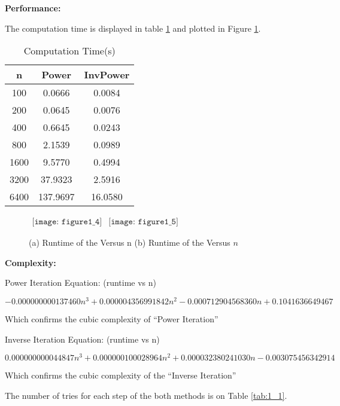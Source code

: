 {{{\LARGE \textbf{Performance:}}

The computation time is displayed in table \ref{tab:1_2} and plotted in Figure \ref{fig:fig1_4}.

\begin{table}[H]
    \centering
    \caption{Computation Time(s)}
    \begin{tabular}{c|c|c}
    n & Power & InvPower \\
    \hline
    \hline
    100  &     0.0666  &  0.0084   \\
    200  &     0.0645  &  0.0076   \\
    400  &     0.6645  &  0.0243   \\
    800  &     2.1539  &  0.0989   \\
    1600 &     9.5770  &  0.4994   \\
    3200 &    37.9323  &  2.5916   \\
    6400 &   137.9697  & 16.0580   \\
    \end{tabular}
    \label{tab:1_2}
\end{table}



\begin{figure}[H]
    \centering
    $\begin{array}{cc}
        \texttt{[image: figure1\_4]} &
        \texttt{[image: figure1\_5]}
    \end{array}$
    \caption{(a) Runtime of the   Versus n (b) Runtime of the   Versus $n$}
    \label{fig:fig1_4}
\end{figure}

{\Large \textbf{Complexity:}}

Power Iteration Equation: (runtime vs n)

$  -0.000000000137460 n^3 +  0.000004356991842  n^2 -0.000712904568360 n + 0.1041636649467$

Which confirms the cubic complexity of ``Power Iteration'' 

Inverse Iteration Equation: (runtime vs n)

$  0.000000000044847 n^3 +  0.000000100028964  n^2 + 0.000032380241030 n -0.003075456342914$

Which confirms the cubic complexity of the ``Inverse Iteration'' 

The number of tries for each step of the both methods is on Table \ref{tab:1_1}.


}}
